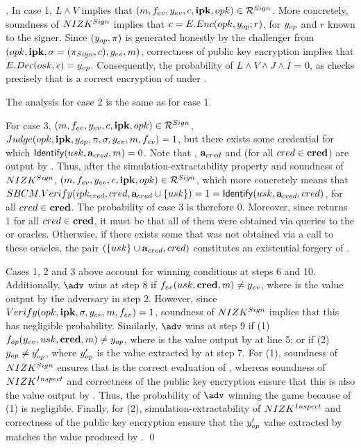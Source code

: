 \begin{proof}[]
  In case 1, $L \land V$ implies that $(m,f_{ev},y_{ev},c,\mathbf{ipk},opk) \in
  \mathcal{R}^{Sign}$. More concretely, soundness of $NIZK^{Sign}$ implies that
  $c = E.Enc(opk,y_{op};r)$, for $y_{op}$ and $r$ known to the signer. Since
  $(y_{op},\pi)$ is generated honestly by the challenger from
  $(opk,\mathbf{ipk},\sigma = (\pi_{Sign},c),y_{ev},m)$, correctness of
  public key encryption implies that $E.Dec(osk,c) = y_{op}$. Consequently,
  the probability of $L \land V \land J \land \overline{I}$ = 0, as \Judge
  checks precisely that \Ec is a correct encryption of \yinsp under \opk.

  The analysis for case 2 is the same as for case 1.

  For case 3, $(m,f_{ev},y_{ev},c,\mathbf{ipk},opk) \in \mathcal{R}^{Sign}$,
  $Judge(opk,\mathbf{ipk},y_{op},\pi,\sigma,y_{ev},m,f_{ev})
  = 1$, but there exists some credential \cred for which $\mathsf{Identify}(usk,
  \mathbf{a}_{cred},m)=0$. Note that \usk, $\mathbf{a}_{cred}$ and \cred (for all
  $cred \in \mathbf{cred}$) are output by \ExtractSign. Thus, after the
  simulation-extractability property and soundness of $NIZK^{Sign}$, $(m,
  f_{ev},y_{ev},c,\mathbf{ipk},opk) \in \mathcal{R}^{Sign}$, which more concretely
  means that $SBCM.Verify(ipk_{cred},cred,\mathbf{a}_{cred} \cup \lbrace usk
  \rbrace) = 1 = \mathsf{Identify}(usk,\mathbf{a}_{cred},cred)$, for all $cred \in
  \mathbf{cred}$. The probability of case 3 is therefore $0$.
  Moreover, since \SBCMVerify returns $1$ for all $cred \in \mathbf{cred}$, it must
  be that all of them were obtained via queries to the \ISSUE or \OBTISS
  oracles. Otherwise, if there exists some \cred that was not obtained via
  a call to these oracles, the pair $(\lbrace usk \rbrace \cup \mathbf{a}_{cred},
  cred)$ constitutes an existential forgery of \SBCM.

  Cases 1, 2 and 3 above account for winning conditions at steps 6 and 10.
  Additionally, $\adv$ wins at step 8 if $f_{ev}(usk,\mathbf{cred},m) \neq y_{ev}$,
  where \yeval is the value output by the adversary in step 2. However, since
  $Verify(opk,\mathbf{ipk},\sigma,y_{ev},m,f_{ev}) = 1$, soundness of $NIZK^{Sign}$
  implies that this has negligible probability.
  Similarly, $\adv$ wins at step 9 if (1) $f_{op}(y_{ev},usk,\mathbf{cred},m) \neq
  y_{op}$, where \yinsp is the value output by \Inspect at line 5; or if (2)
  $y_{op} \neq y_{op}'$, where $y_{op}'$ is the value extracted by \ExtractSign
  at step 7. For (1), soundness of $NIZK^{Sign}$ ensures that \yinsp is the
  correct evaluation of \finsp, whereas soundness of $NIZK^{Inspect}$ and
  correctness of the public key encryption ensure that this is also the value
  output by \Inspect. Thus, the probability of $\adv$ winning the game because
  of (1) is negligible. Finally, for (2), simulation-extractability of
  $NIZK^{Inspect}$ and correctness of the public key encryption ensure that
  the $y_{op}'$ value extracted by \NIZKExtract matches the value produced by
  \Inspect.
  \qed
\end{proof}

